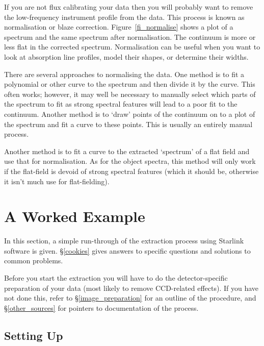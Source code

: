 \documentclass[twoside,11pt]{starlink}
\providecommand{\mlabel}[1]{\xlabel{#1}\label{#1}}
\providecommand{\scspec}[2]{#1}
\begin{document}
If you are not flux calibrating your data then you will probably want to
remove the low-frequency instrument profile from the data.  This process
is known as normalisation or blaze correction.
\scspec{Figure~\ref{fi_normalise}}{The figure above} shows a plot of
a spectrum and the same spectrum after normalisation.
The continuum is more or less flat in the corrected spectrum.
Normalisation can be useful when you want to look at absorption line
profiles, model their shapes, or determine their widths.

There are several approaches to normalising the data.
One method is to fit a polynomial or other curve to the
spectrum and then divide it by the curve.
This often works; however, it may well be necessary to manually
select which parts of the spectrum to fit as strong spectral
features will lead to a poor fit to the continuum.
Another method is to `draw' points of the continuum on to a plot
of the spectrum and fit a curve to these points.
This is usually an entirely manual process.

Another method is to fit a curve to the extracted `spectrum' of a
flat field and use that for normalisation.
As for the object spectra, this method will only work if the flat-field
is devoid of strong spectral features (which it should be, otherwise it
isn't much use for flat-fielding).


\section{\mlabel{simple_worked_example}A Worked Example}


In this section, a simple run-through of the extraction process using
Starlink software is given.
\scspec{\S\ref{cookies}}{The \htmlref{cookies}{cookies} section}
gives answers to specific questions and solutions to common problems.

Before you start the extraction you will have to do the
detector-specific preparation of your data (most likely to remove
CCD-related effects).
If you have not done this, refer to \scspec{\S\ref{image_preparation}}
{\htmlref{Image Preparation}{image_preparation}} for an outline of the
procedure, and \scspec{\S\ref{other_sources}}
{\htmlref{Other Sources of Information}{other_sources}} for pointers
to documentation of the process.


\subsection{Setting Up}
\end{document}
